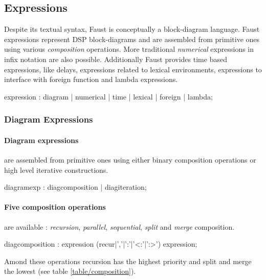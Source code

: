 \documentclass{article}
\begin{document}
 
  
\subsection{Expressions}

Despite its textual syntax, Faust is conceptually a block-diagram language. Faust expressions represent DSP block-diagrams and are assembled from primitive ones using various \textit{composition} operations. More traditional \textit{numerical} expressions in infix notation are also possible. Additionally Faust provides time based expressions, like delays, expressions related to lexical environments, expressions to interface with foreign function and lambda expressions.

\begin{rail}
expression : diagram | numerical | time | lexical | foreign | lambda;
\end{rail}
  
\subsubsection{Diagram Expressions}

\paragraph{Diagram expressions} are assembled from primitive ones using either binary composition operations or high level iterative constructions.
 
\begin{rail}
diagramexp : diagcomposition | diagiteration;
\end{rail}

\paragraph{Five composition operations} are available : \textit{recursion}, \textit{parallel}, \textit{sequential}, \textit{split} and \textit{merge} composition.

\begin{rail}
diagcomposition : expression (recur|','|':'|'<:'|':>') expression;
\end{rail}

Amond these operations recursion has the highest priority and split and merge the lowest (see table \ref{table/composition}).
 
\end{document}
